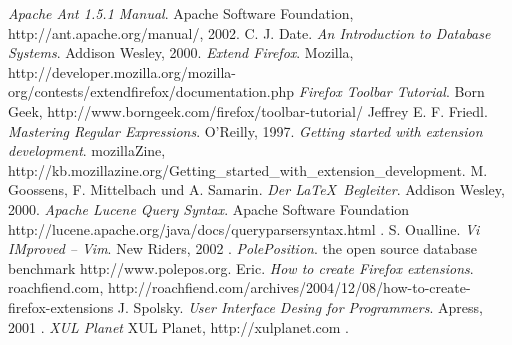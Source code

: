 \begin{thebibliography}{keine ah}

\bibitem[Apa02]{} \emph{Apache Ant 1.5.1 Manual}. Apache Software Foundation, http://ant.apache.org/manual/, 2002.
\bibitem[Dat00]{} C. J. Date. \emph{An Introduction to Database Systems}. Addison Wesley, 2000.
\bibitem[ExFF]{} \emph{Extend Firefox}. Mozilla, http://developer.mozilla.org/mozilla-org/contests/extendfirefox/documentation.php
\bibitem[FFTT]{} \emph{Firefox Toolbar Tutorial}. Born Geek, http://www.borngeek.com/firefox/toolbar-tutorial/
\bibitem[Fri97]{} Jeffrey E. F. Friedl. \emph{Mastering Regular Expressions}. O'Reilly, 1997.
\bibitem[Gswed]{} \emph{Getting started with extension development}. mozillaZine, http://kb.mozillazine.org/Getting\_started\_with\_extension\_development.
\bibitem[Goo00]{} M. Goossens, F. Mittelbach und A. Samarin. \emph{Der \LaTeX \ Begleiter}. Addison Wesley, 2000.
\bibitem[LucQS]{} \emph{Apache Lucene Query Syntax}. Apache Software Foundation http://lucene.apache.org/java/docs/queryparsersyntax.html .
\bibitem[Oua02]{} S. Oualline. \emph{Vi IMproved -- Vim}. New Riders, 2002 .
\bibitem[PolPos]{} \emph{PolePosition}. the open source database benchmark http://www.polepos.org.
\bibitem[Roac04]{} Eric. \emph{How to create Firefox extensions}. roachfiend.com, http://roachfiend.com/archives/2004/12/08/how-to-create-firefox-extensions
\bibitem[Spo01]{} J. Spolsky. \emph{User Interface Desing for Programmers}. Apress, 2001 .
\bibitem[XULPL]{} \emph{XUL Planet} XUL Planet, http://xulplanet.com .

\end{thebibliography}

